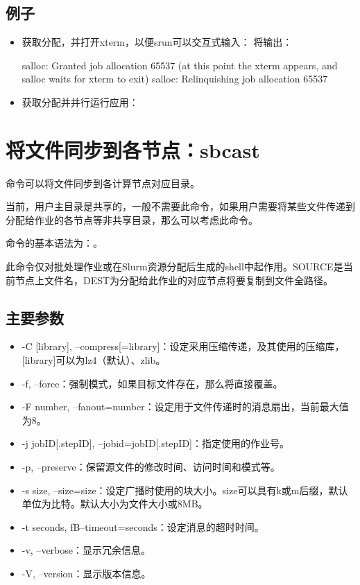 \subsection{例子}
\begin{itemize}
	\item 获取分配，并打开xterm，以便srun可以交互式输入：
将输出：
\begin{OUT}
salloc: Granted job allocation 65537
(at this point the xterm appears, and salloc waits for xterm to exit)
salloc: Relinquishing job allocation 65537
\end{OUT}
	\item 获取分配并并行运行应用：
\end{itemize}

\section{将文件同步到各节点：sbcast}
命令可以将文件同步到各计算节点对应目录。

当前，用户主目录是共享的，一般不需要此命令，如果用户需要将某些文件传递到分配给作业的各节点等非共享目录，那么可以考虑此命令。

命令的基本语法为：。

此命令仅对批处理作业或在Slurm资源分配后生成的shell中起作用。SOURCE是当前节点上文件名，DEST为分配给此作业的对应节点将要复制到文件全路径。

\subsection{主要参数}
\begin{itemize}
	\item -C [library], --compress[=library]：设定采用压缩传递，及其使用的压缩库，[library]可以为lz4（默认）、zlib。
    \item -f, --force：强制模式，如果目标文件存在，那么将直接覆盖。
    \item -F number, --fanout=number：设定用于文件传递时的消息扇出，当前最大值为8。
    \item -j jobID[.stepID], --jobid=jobID[.stepID]：指定使用的作业号。
    \item -p, --preserve：保留源文件的修改时间、访问时间和模式等。
    \item -s size, --size=size：设定广播时使用的块大小。size可以具有k或m后缀，默认单位为比特。默认大小为文件大小或8MB。
    \item -t seconds, fB--timeout=seconds：设定消息的超时时间。
    \item -v, --verbose：显示冗余信息。
    \item -V, --version：显示版本信息。
\end{itemize}

